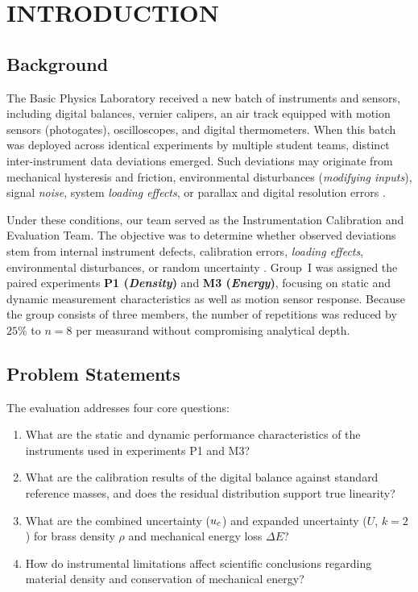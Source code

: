 \documentclass[a4paper, 12pt]{article}
\begin{document}
\renewcommand{\figurename}{Figure}
\renewcommand{\tablename}{Table}

    
    

\newpage
\section{INTRODUCTION}
        \subsection{Background}
        The Basic Physics Laboratory received a new batch of instruments and sensors, including digital balances, vernier calipers, an air track equipped with motion sensors (photogates), oscilloscopes, and digital thermometers. When this batch was deployed across identical experiments by multiple student teams, distinct inter-instrument data deviations emerged. Such deviations may originate from mechanical hysteresis and friction, environmental disturbances (\textit{modifying inputs}), signal \textit{noise}, system \textit{loading effects}, or parallax and digital resolution errors \parencite{Bentley2005}.

        Under these conditions, our team served as the Instrumentation Calibration and Evaluation Team. The objective was to determine whether observed deviations stem from internal instrument defects, calibration errors, \textit{loading effects}, environmental disturbances, or random uncertainty \parencite{Yhuwana2026}. Group~I was assigned the paired experiments \textbf{P1 (\textit{Density})} and \textbf{M3 (\textit{Energy})}, focusing on static and dynamic measurement characteristics as well as motion sensor response. Because the group consists of three members, the number of repetitions was reduced by $25\%$ to $n=8$ per measurand without compromising analytical depth.

        \subsection{Problem Statements}
        The evaluation addresses four core questions:
        \begin{enumerate}
            \item What are the static and dynamic performance characteristics of the instruments used in experiments P1 and M3?
            \item What are the calibration results of the digital balance against standard reference masses, and does the residual distribution support true linearity?
            \item What are the combined uncertainty ($u_{c}$) and expanded uncertainty ($U$, $k=2$) for brass density $\rho$ and mechanical energy loss $\Delta E$?
            \item How do instrumental limitations affect scientific conclusions regarding material density and conservation of mechanical energy?
        \end{enumerate}
\end{document}

